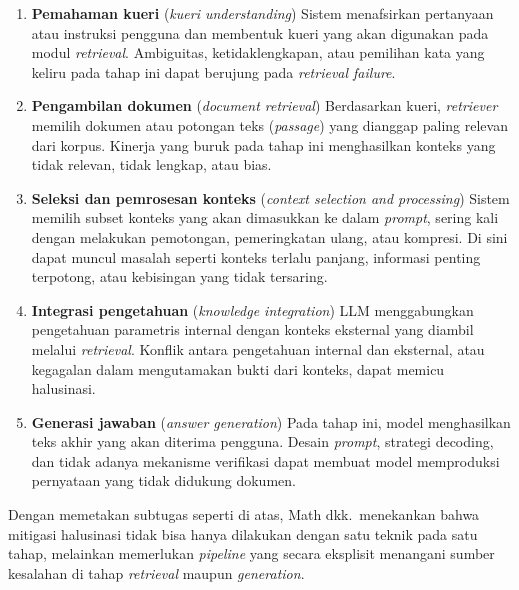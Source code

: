 \begin{enumerate}[1.]
  \item \textbf{Pemahaman kueri} (\textit{kueri understanding})
  Sistem menafsirkan pertanyaan atau instruksi pengguna dan membentuk kueri yang akan digunakan pada modul \textit{retrieval}. Ambiguitas, ketidaklengkapan, atau pemilihan kata yang keliru pada tahap ini dapat berujung pada \textit{retrieval failure}.

  \item \textbf{Pengambilan dokumen} (\textit{document retrieval})
  Berdasarkan kueri, \textit{retriever} memilih dokumen atau potongan teks (\textit{passage}) yang dianggap paling relevan dari korpus. Kinerja yang buruk pada tahap ini menghasilkan konteks yang tidak relevan, tidak lengkap, atau bias.

  \item \textbf{Seleksi dan pemrosesan konteks} (\textit{context selection and processing})
  Sistem memilih subset konteks yang akan dimasukkan ke dalam \textit{prompt}, sering kali dengan melakukan pemotongan, pemeringkatan ulang, atau kompresi. Di sini dapat muncul masalah seperti konteks terlalu panjang, informasi penting terpotong, atau kebisingan yang tidak tersaring.

  \item \textbf{Integrasi pengetahuan} (\textit{knowledge integration})
  LLM menggabungkan pengetahuan parametris internal dengan konteks eksternal yang diambil melalui \textit{retrieval}. Konflik antara pengetahuan internal dan eksternal, atau kegagalan dalam mengutamakan bukti dari konteks, dapat memicu halusinasi.

  \item \textbf{Generasi jawaban} (\textit{answer generation})
  Pada tahap ini, model menghasilkan teks akhir yang akan diterima pengguna. Desain \textit{prompt}, strategi decoding, dan tidak adanya mekanisme verifikasi dapat membuat model memproduksi pernyataan yang tidak didukung dokumen.
\end{enumerate}

Dengan memetakan subtugas seperti di atas, Math dkk.\ menekankan bahwa mitigasi halusinasi tidak bisa hanya dilakukan dengan satu teknik pada satu tahap, melainkan memerlukan \textit{pipeline} yang secara eksplisit menangani sumber kesalahan di tahap \textit{retrieval} maupun \textit{generation}.


